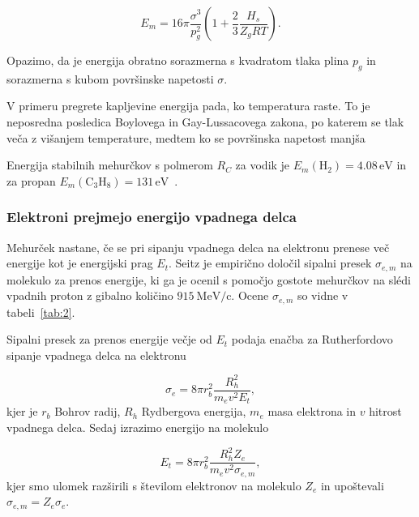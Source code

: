 \begin{equation*}
E_m = 16 \pi \frac{\sigma ^3}{p_g ^2} \left( 1 + \frac{2}{3} \frac{H_s }{Z_g R T}\right).
\end{equation*}

Opazimo, da je energija obratno sorazmerna s kvadratom tlaka plina \( p_g \) in sorazmerna s kubom površinske napetosti \( \sigma \).

V primeru pregrete kapljevine energija pada, ko temperatura raste. To je neposredna posledica Boylovega in Gay-Lussacovega zakona, po katerem se tlak veča z višanjem temperature, medtem ko se površinska napetost manjša~\cite{seitz_theory_1958, strnad_fizika_2016}
  
Energija stabilnih mehurčkov s polmerom \( R_C \) za vodik je \( E_m (\mathrm{H}_2) = 4.08 \, \mathrm{eV}  \) in za propan \( E_m (\mathrm{C}_3 \mathrm{H}_8) = 131 \, \mathrm{eV} \)~\cite{seitz_theory_1958}.


\subsubsection*{Elektroni prejmejo energijo vpadnega delca}

Mehurček nastane, če se pri sipanju vpadnega delca na elektronu prenese več energije kot je energijski prag \( E_t \). Seitz je empirično določil sipalni presek \( \sigma_{e, m} \) na molekulo za prenos energije, ki ga je ocenil s pomočjo gostote mehurčkov na slédi vpadnih proton z gibalno količino \( 915 \ \mathrm{MeV} / \mathrm{c} \). Ocene \( \sigma_{e, m} \) so vidne v tabeli~\ref{tab:2}.

Sipalni presek za prenos energije večje od \( E_t \) podaja enačba za Rutherfordovo sipanje vpadnega delca na elektronu

\[  \sigma_e = 8 \pi r_b ^2 \frac{R_h ^2}{m_e v ^2 E_t},
\]
kjer je \( r_b \) Bohrov radij, \( R_h \) Rydbergova energija, \( m_e \) masa elektrona in \( v \) hitrost vpadnega delca. Sedaj izrazimo energijo na molekulo

\[ E_t = 8\pi r_b ^2 \frac{R_h ^2 Z_e}{m_e v ^2 \sigma_{e, m}},
\]
kjer smo ulomek razširili s številom elektronov na molekulo \( Z_e \) in upoštevali \( \sigma_{e, m} = Z_e \sigma_e \).


